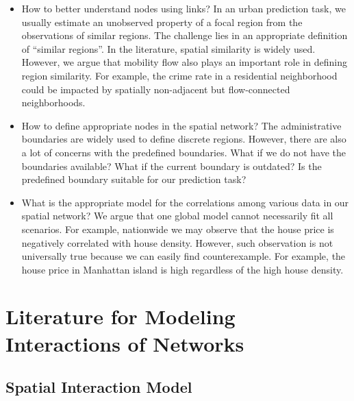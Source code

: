 \begin{itemize}
\item How to better understand nodes using links? In an urban prediction task, we usually estimate an unobserved property of a focal region from the observations of similar regions. The challenge lies in an appropriate definition of ``similar regions''. In the literature, spatial similarity is widely used. However, we argue that mobility flow also plays an important role in defining region similarity. For example, the crime rate in a residential neighborhood could be impacted by spatially non-adjacent but flow-connected neighborhoods.
\item How to define appropriate nodes in the spatial network? The administrative boundaries are widely used to define discrete regions. However, there are also a lot of concerns with the predefined boundaries. What if we do not have the boundaries available? What if the current boundary is outdated? Is the predefined boundary suitable for our prediction task?
\item What is the appropriate model for the correlations among various data in our spatial network? We argue that one global model cannot necessarily fit all scenarios. For example, nationwide we may observe that the house price is negatively correlated with house density. However, such observation is not universally true because we can easily find counterexample. For example, the house price in Manhattan island is high regardless of the high house density.
\end{itemize}




\section{Literature for Modeling Interactions of Networks}
\label{sec:ew}



\subsection{Spatial Interaction Model}


